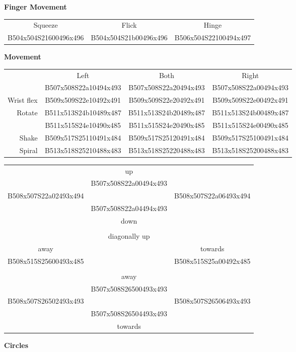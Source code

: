 \documentclass{article}
\begin{document}
\begin{multicols}{3}
\noindent
\textbf{Finger Movement}

\noindent
\begin{tabular}{ccc}
Squeeze&Flick&Hinge\\
B504x504S21600496x496&B504x504S21b00496x496&B506x504S22100494x497\\
\end{tabular}

\noindent
\textbf{Movement}

\noindent
\begin{tabular}{rccc}
&Left&Both&Right\\
&B507x508S22a10494x493&B507x508S22a20494x493&B507x508S22a00494x493\\
Wrist flex&B509x509S22e10492x491&B509x509S22e20492x491&B509x509S22e00492x491\\
\multirow{2}{*}{Rotate}&B511x513S24b10489x487&B511x513S24b20489x487&B511x513S24b00489x487\\
&B511x515S24e10490x485&B511x515S24e20490x485&B511x515S24e00490x485\\
Shake&B509x517S25110491x484&B509x517S25120491x484&B509x517S25100491x484\\
Spiral&B513x518S25210488x483&B513x518S25220488x483&B513x518S25200488x483\\
\end{tabular}

\columnbreak

\noindent
\begin{tabular}{ccc}
&up\\
&B507x508S22a00494x493\\
B508x507S22a02493x494&&B508x507S22a06493x494\\
&B507x508S22a04494x493\\
&down\\
\\
\multicolumn{3}{c}{diagonally up}\\
away&&towards\\
B508x515S25600493x485&&B508x515S25a00492x485\\
\\
&away\\
&B507x508S26500493x493\\
B508x507S26502493x493&&B508x507S26506493x493\\
&B507x508S26504493x493\\
&towards\\
\end{tabular}

\noindent
\textbf{Circles}


\end{multicols}
\end{document}
